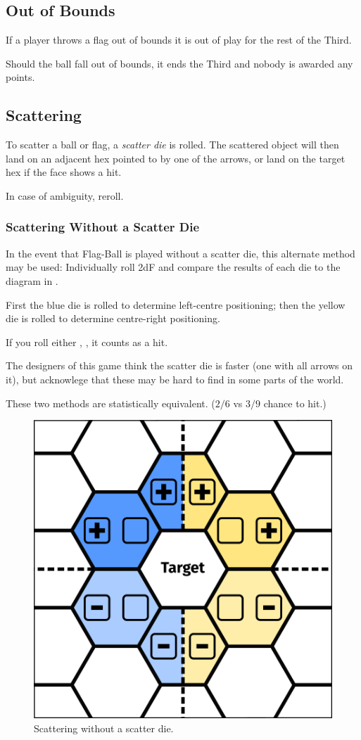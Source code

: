 \subsection{Out of Bounds}
If a player throws a flag out of bounds it is out of play for the rest of the Third.

Should the ball fall out of bounds, it ends the Third and nobody is awarded any points.

\subsection{Scattering}\label{scattering}
To scatter a ball or flag, a \textit{scatter die} is rolled.
The scattered object will then land on an adjacent hex pointed to by one of the arrows, or land on the target hex if the face shows a hit.

In case of ambiguity, reroll.

\subsubsection{Scattering Without a Scatter Die}
In the event that Flag-Ball is played without a scatter die, this alternate method may be used:
Individually roll 2dF and compare the results of each die to the diagram in .

First the blue die is rolled to determine left-centre positioning; then the yellow die is rolled to determine centre-right positioning.

If you roll either \plus{}\minus{}, \minus{}\plus{}, \blank{}\blank{} it counts as a hit.

\begin{note}
The designers of this game think the scatter die is faster (one with all arrows on it), but acknowlege that these may be hard to find in some parts of the world.

These two methods are statistically equivalent. ($2/6$ vs $3/9$ chance to hit.)
\end{note}

\begin{figure}
    \centering
    \includegraphics{graphics/scatter.png}
    \caption{Scattering without a scatter die.}
    \label{fig:scatter-alternative}
\end{figure}